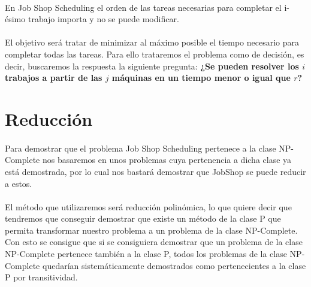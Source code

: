 \documentclass[11pt, a4paper,spanish]{article}
\begin{document}
			\paragraph{}
			En Job Shop Scheduling el orden de las tareas necesarias para completar el i-ésimo trabajo importa y no se puede modificar.
			 
			\paragraph{}
			El objetivo será tratar de minimizar al máximo posible el tiempo necesario para completar todas las tareas. Para ello trataremos el problema como de decisión, es decir, buscaremos la respuesta la siguiente pregunta:  
			\newline
			{ \bf ¿Se pueden resolver los $i$ trabajos a partir de las $j$ máquinas en un tiempo menor o igual que $r$?}
			
		\section{Reducción}
		
			\paragraph{}
			Para demostrar que el problema Job Shop Scheduling pertenece a la clase NP-Complete nos basaremos en unos problemas cuya pertenencia a dicha clase ya está demostrada, por lo cual nos bastará demostrar que JobShop se puede reducir a estos. 
			
			\paragraph{}
			El método que utilizaremos será reducción polinómica, lo que quiere decir que tendremos que conseguir demostrar que existe un método de la clase P que permita transformar nuestro problema a un problema de la clase NP-Complete. Con esto se consigue que si se consiguiera demostrar que un problema de la clase NP-Complete pertenece también a la clase P, todos los problemas de la clase NP-Complete quedarían sistemáticamente demostrados como pertenecientes a la clase P por transitividad.
			
			
\end{document}
